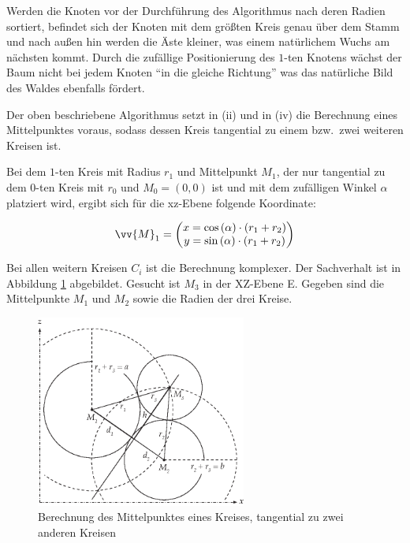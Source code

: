Werden die Knoten vor der Durchführung des Algorithmus nach deren Radien sortiert, befindet sich der Knoten mit dem größten Kreis genau über dem Stamm und nach außen hin werden die Äste kleiner, was einem natürlichem Wuchs am nächsten kommt. Durch die zufällige Positionierung des $1$-ten Knotens wächst der Baum nicht bei jedem Knoten "`in die gleiche Richtung"' was das natürliche Bild des Waldes ebenfalls fördert.

Der oben beschriebene Algorithmus setzt in (ii) und in (iv) die Berechnung eines Mittelpunktes voraus, sodass dessen Kreis tangential zu einem bzw.\ zwei weiteren Kreisen ist.

Bei dem $1$-ten Kreis mit Radius $r_1$ und Mittelpunkt $M_1$, der nur tangential zu dem $0$-ten Kreis mit $r_0$ und $M_0 = (0,0)$ ist und mit dem zufälligen Winkel $\alpha$ platziert wird, ergibt sich für die xz-Ebene folgende Koordinate:

\begin{equation}
  \vv{M}_1 =
  \begin{pmatrix}
    x = \cos\left(\alpha\right) \cdot \left(r_1 + r_2\right)\\
    y = \sin\left(\alpha\right) \cdot \left(r_1 + r_2\right)\\
  \end{pmatrix}
\end{equation}

Bei allen weitern Kreisen $C_i$ ist die Berechnung komplexer. Der Sachverhalt ist in Abbildung \ref{fig:tangent-circle} abgebildet. Gesucht ist $M_3$ in der XZ-Ebene E. Gegeben sind die Mittelpunkte $M_1$ und $M_2$ sowie die Radien der drei Kreise.

\begin{figure}[htb]
  \includegraphics[width=261.593px]{figures/tangent-circle}
  \caption{Berechnung des Mittelpunktes eines Kreises, tangential zu zwei anderen Kreisen}
  \label{fig:tangent-circle}
\end{figure}

